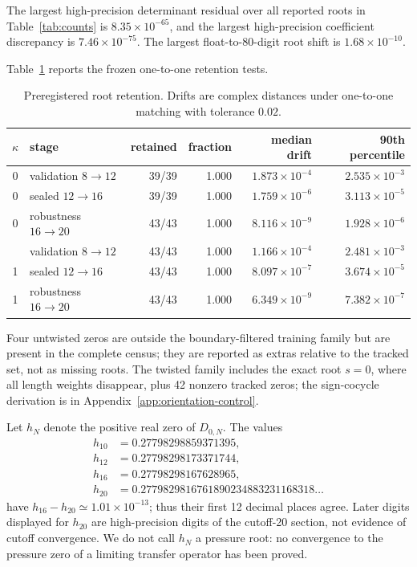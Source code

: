 The largest high-precision determinant residual over all reported roots in
Table~\ref{tab:counts} is
\(8.35\times10^{-65}\), and the largest high-precision coefficient
discrepancy is \(7.46\times10^{-75}\).  The largest float-to-80-digit root
shift is \(1.68\times10^{-10}\).

Table~\ref{tab:stability} reports the frozen one-to-one retention tests.
\begin{table}[t]
\centering
\caption{Preregistered root retention.  Drifts are complex distances under
one-to-one matching with tolerance \(0.02\).}
\label{tab:stability}
\begin{tabular}{clrrrr}
\toprule
\(\kappa\)&stage&retained&fraction&median drift&90th percentile\\
\midrule
0&validation \(8\to12\)&39/39&1.000&\(1.873\times10^{-4}\)&\(2.535\times10^{-3}\)\\
0&sealed \(12\to16\)&39/39&1.000&\(1.759\times10^{-6}\)&\(3.113\times10^{-5}\)\\
0&robustness \(16\to20\)&43/43&1.000&\(8.116\times10^{-9}\)&\(1.928\times10^{-6}\)\\
\addlinespace
1&validation \(8\to12\)&43/43&1.000&\(1.166\times10^{-4}\)&\(2.481\times10^{-3}\)\\
1&sealed \(12\to16\)&43/43&1.000&\(8.097\times10^{-7}\)&\(3.674\times10^{-5}\)\\
1&robustness \(16\to20\)&43/43&1.000&\(6.349\times10^{-9}\)&\(7.382\times10^{-7}\)\\
\bottomrule
\end{tabular}
\end{table}

Four untwisted zeros are outside the boundary-filtered training family but are
present in the complete census; they are reported as extras relative to the
tracked set, not as missing roots.  The twisted family includes the exact root
\(s=0\), where all length weights disappear, plus 42 nonzero tracked zeros;
the sign-cocycle derivation is in
Appendix~\ref{app:orientation-control}.

Let \(h_N\) denote the positive real zero of \(D_{0,N}\).  The values
\[
\begin{aligned}
h_{10}&=0.27798298859371395,\\
h_{12}&=0.27798298173371744,\\
h_{16}&=0.27798298167628965,\\
h_{20}&=0.2779829816761890234883231168318\ldots
\end{aligned}
\]
have \(h_{16}-h_{20}\simeq1.01\times10^{-13}\); thus their first 12 decimal
places agree.  Later digits displayed for \(h_{20}\) are high-precision digits
of the cutoff-20 section, not evidence of cutoff convergence.  We do not call
\(h_N\) a pressure root: no convergence to
the pressure zero of a limiting transfer operator has been proved.


